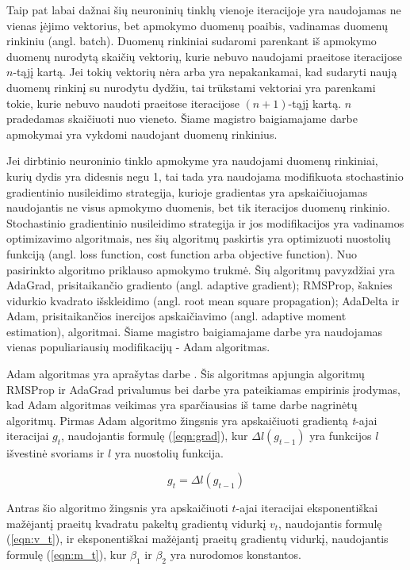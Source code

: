 Taip pat labai dažnai šių neuroninių tinklų vienoje iteracijoje yra naudojamas ne vienas įėjimo vektorius, bet apmokymo duomenų poaibis, vadinamas duomenų rinkiniu (angl. batch). Duomenų rinkiniai sudaromi parenkant iš apmokymo duomenų nurodytą skaičių vektorių, kurie nebuvo naudojami praeitose iteracijose $n$-tąjį kartą. Jei tokių vektorių nėra arba yra nepakankamai, kad sudaryti naują duomenų rinkinį su nurodytu dydžiu, tai trūkstami vektoriai yra parenkami tokie, kurie nebuvo naudoti praeitose iteracijose $(n + 1)$-tąjį kartą. $n$ pradedamas skaičiuoti nuo vieneto. Šiame magistro baigiamajame darbe apmokymai yra vykdomi naudojant duomenų rinkinius.

Jei dirbtinio neuroninio tinklo apmokyme yra naudojami duomenų rinkiniai, kurių dydis yra didesnis negu 1, tai tada yra naudojama modifikuota stochastinio gradientinio nusileidimo strategija, kurioje gradientas yra apskaičiuojamas naudojantis ne visus apmokymo duomenis, bet tik iteracijos duomenų rinkinio. Stochastinio gradientinio nusileidimo strategija ir jos modifikacijos yra vadinamos optimizavimo algoritmais, nes šių algoritmų paskirtis yra optimizuoti nuostolių funkciją (angl. loss function, cost function arba objective function). Nuo pasirinkto algoritmo priklauso apmokymo trukmė. Šių algoritmų pavyzdžiai yra AdaGrad, prisitaikančio gradiento (angl. adaptive gradient); RMSProp, šaknies vidurkio kvadrato išskleidimo (angl. root mean square propagation); AdaDelta ir Adam, prisitaikančios inercijos apskaičiavimo (angl. adaptive moment estimation), algoritmai. Šiame magistro baigiamajame darbe yra naudojamas vienas populiariausių modifikacijų - Adam algoritmas.

Adam algoritmas yra aprašytas darbe \cite{adam}. Šis algoritmas apjungia algoritmų RMSProp ir AdaGrad privalumus bei darbe \cite{adam} yra pateikiamas empirinis įrodymas, kad Adam algoritmas veikimas yra sparčiausias iš tame darbe nagrinėtų algoritmų. Pirmas Adam algoritmo žingsnis yra apskaičiuoti gradientą \textit{t}-ajai iteracijai $g_t$, naudojantis formulę (\ref{eqn:grad}), kur $\Delta l(g_{t-1})$ yra funkcijos $l$ išvestinė svoriams ir $l$ yra nuostolių funkcija.

\begin{equation}
\label{eqn:grad}
	g_t = \Delta l(g_{t-1})
\end{equation}

Antras šio algoritmo žingsnis yra apskaičiuoti $t$-ajai iteracijai eksponentiškai mažėjantį praeitų kvadratu pakeltų gradientų vidurkį $v_t$, naudojantis formulę (\ref{eqn:v_t}), ir eksponentiškai mažėjantį praeitų gradientų vidurkį, naudojantis formulę (\ref{eqn:m_t}), kur $\beta_1$ ir $\beta_2$ yra nurodomos konstantos.

